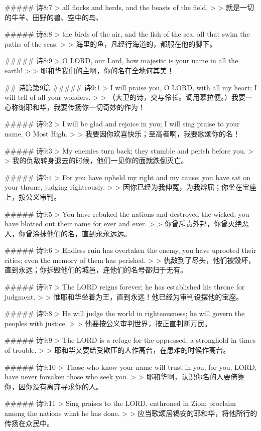 ##### 诗8:7
> all flocks and herds, and the beasts of the field,
>
> 就是一切的牛羊、田野的兽、空中的鸟、


##### 诗8:8
> the birds of the air, and the fish of the sea, all that swim the paths of the seas.
>
> 海里的鱼，凡经行海道的，都服在他的脚下。


##### 诗8:9
> O LORD, our Lord, how majestic is your name in all the earth!
>
> 耶和华我们的主啊，你的名在全地何其美！


## 诗篇第9篇
##### 诗9:1
> I will praise you, O LORD, with all my heart; I will tell of all your wonders.
>
> （大卫的诗，交与伶长。调用慕拉便。）我要一心称谢耶和华，我要传扬你一切奇妙的作为！


##### 诗9:2
> I will be glad and rejoice in you; I will sing praise to your name, O Most High.
>
> 我要因你欢喜快乐；至高者啊，我要歌颂你的名！


##### 诗9:3
> My enemies turn back; they stumble and perish before you.
>
> 我的仇敌转身退去的时候，他们一见你的面就跌倒灭亡。


##### 诗9:4
> For you have upheld my right and my cause; you have sat on your throne, judging righteously.
>
> 因你已经为我伸冤，为我辨屈；你坐在宝座上，按公义审判。


##### 诗9:5
> You have rebuked the nations and destroyed the wicked; you have blotted out their name for ever and ever.
>
> 你曾斥责外邦，你曾灭绝恶人，你曾涂抹他们的名，直到永永远远。


##### 诗9:6
> Endless ruin has overtaken the enemy, you have uprooted their cities; even the memory of them has perished.
>
> 仇敌到了尽头，他们被毁坏，直到永远；你拆毁他们的城邑，连他们的名号都归于无有。


##### 诗9:7
> The LORD reigns forever; he has established his throne for judgment.
>
> 惟耶和华坐着为王，直到永远！他已经为审判设摆他的宝座。


##### 诗9:8
> He will judge the world in righteousness; he will govern the peoples with justice.
>
> 他要按公义审判世界，按正直判断万民。


##### 诗9:9
> The LORD is a refuge for the oppressed, a stronghold in times of trouble.
>
> 耶和华又要给受欺压的人作高台，在患难的时候作高台。


##### 诗9:10
> Those who know your name will trust in you, for you, LORD, have never forsaken those who seek you.
>
> 耶和华啊，认识你名的人要倚靠你，因你没有离弃寻求你的人。


##### 诗9:11
> Sing praises to the LORD, enthroned in Zion; proclaim among the nations what he has done.
>
> 应当歌颂居锡安的耶和华，将他所行的传扬在众民中。


